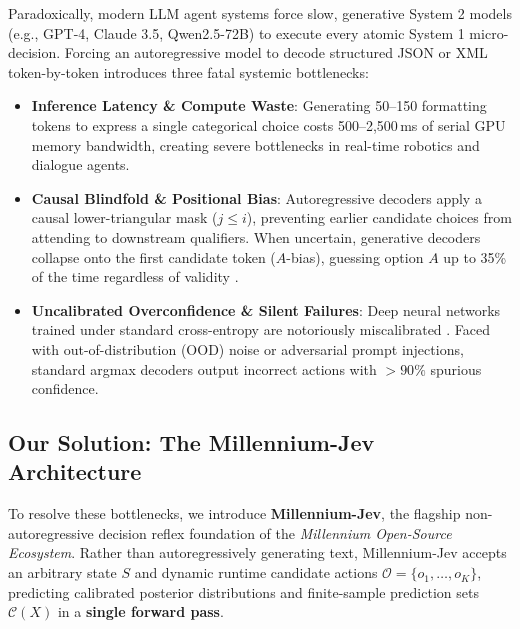 \documentclass[11pt,a4paper]{article}
\begin{document}
Paradoxically, modern LLM agent systems force slow, generative System 2 models (e.g., GPT-4, Claude 3.5, Qwen2.5-72B) to execute every atomic System 1 micro-decision. Forcing an autoregressive model to decode structured JSON or XML token-by-token introduces three fatal systemic bottlenecks:
\begin{itemize}
    \item \textbf{Inference Latency \& Compute Waste}: Generating 50--150 formatting tokens to express a single categorical choice costs 500--2,500\,ms of serial GPU memory bandwidth, creating severe bottlenecks in real-time robotics and dialogue agents.
    \item \textbf{Causal Blindfold \& Positional Bias}: Autoregressive decoders apply a causal lower-triangular mask ($j \le i$), preventing earlier candidate choices from attending to downstream qualifiers. When uncertain, generative decoders collapse onto the first candidate token ($A$-bias), guessing option $A$ up to 35\% of the time regardless of validity \cite{zheng2023large}.
    \item \textbf{Uncalibrated Overconfidence \& Silent Failures}: Deep neural networks trained under standard cross-entropy are notoriously miscalibrated \cite{guo2017calibration}. Faced with out-of-distribution (OOD) noise or adversarial prompt injections, standard argmax decoders output incorrect actions with $>90\%$ spurious confidence.
\end{itemize}

\subsection{Our Solution: The Millennium-Jev Architecture}
To resolve these bottlenecks, we introduce \textbf{Millennium-Jev}, the flagship non-autoregressive decision reflex foundation of the \textit{Millennium Open-Source Ecosystem}. Rather than autoregressively generating text, Millennium-Jev accepts an arbitrary state $S$ and dynamic runtime candidate actions $\mathcal{O} = \{o_1, \dots, o_K\}$, predicting calibrated posterior distributions and finite-sample prediction sets $\mathcal{C}(X)$ in a \textbf{single forward pass}.
\end{document}

